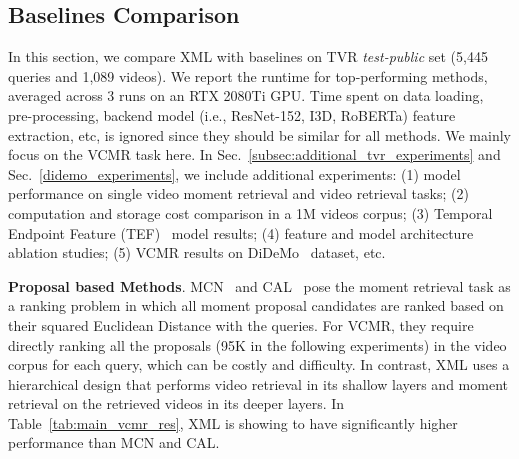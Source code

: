 \documentclass[runningheads]{llncs}
\begin{document}
\subsection{Baselines Comparison}\label{subsec:baseline_comparison}
In this section, we compare XML with baselines on TVR \textit{test-public} set (5,445 queries and 1,089 videos). We report the runtime for top-performing methods, averaged across 3 runs on an RTX 2080Ti GPU. Time spent on data loading, pre-processing, backend model (i.e., ResNet-152, I3D, RoBERTa) feature extraction, etc, is ignored since they should be similar for all methods. We mainly focus on the VCMR task here. In Sec.~\ref{subsec:additional_tvr_experiments} and Sec.~\ref{didemo_experiments}, we include additional experiments: (1) model performance on single video moment retrieval and video retrieval tasks; (2) computation and storage cost comparison in a 1M videos corpus; (3) Temporal Endpoint Feature (TEF)~\cite{anne2017localizing} model results; (4) feature and model architecture ablation studies; (5) VCMR results on DiDeMo~\cite{anne2017localizing} dataset, etc.

\kern1mm
\noindent\textbf{Proposal based Methods}. MCN~\cite{anne2017localizing} and CAL~\cite{escorcia2019temporal} pose the moment retrieval task as a ranking problem in which all moment proposal candidates are ranked based on their squared Euclidean Distance with the queries. 
For VCMR, they require directly ranking all the proposals (95K in the following experiments) in the video corpus for each query, which can be costly and difficulty.
In contrast, XML uses a hierarchical design that performs video retrieval in its shallow layers and moment retrieval on the retrieved videos in its deeper layers. 
In Table~\ref{tab:main_vcmr_res}, XML is showing to have significantly higher performance than MCN and CAL.
\end{document}
